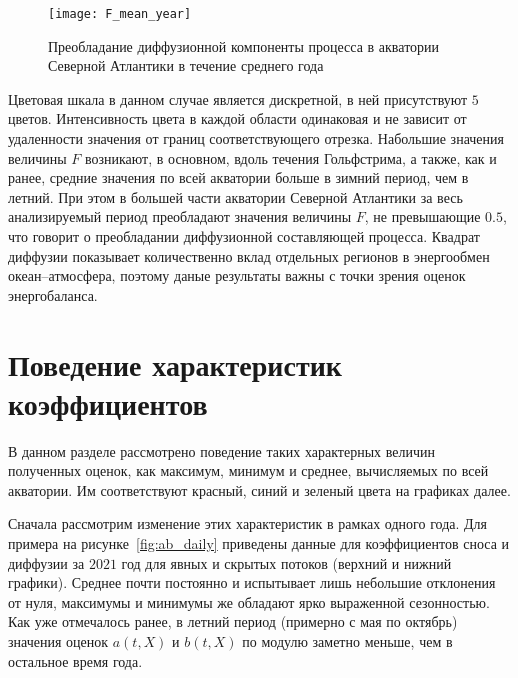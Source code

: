 
\begin{figure}[!h]
	\centering
	\texttt{[image: F\_mean\_year]}
	\caption{Преобладание диффузионной компоненты процесса в акватории Северной Атлантики в течение среднего года}
	\label{fig:f_mean_year}
\end{figure}

Цветовая шкала в данном случае является дискретной, в ней присутствуют $5$ цветов. Интенсивность цвета в каждой области одинаковая и не зависит от удаленности значения от границ соответствующего отрезка. Набольшие значения величины $F$ возникают, в основном, вдоль течения Гольфстрима, а также, как и ранее, средние значения по всей акватории больше в зимний период, чем в летний. При этом в большей части акватории Северной Атлантики за весь анализируемый период преобладают значения величины $F$, не превышающие $0.5$, что говорит о преобладании диффузионной составляющей процесса. Квадрат диффузии показывает количественно вклад отдельных регионов в энергообмен океан--атмосфера, поэтому даные результаты важны с точки зрения оценок энергобаланса.

\section{Поведение характеристик коэффициентов}

В данном разделе рассмотрено поведение таких характерных величин полученных оценок, как максимум, минимум и среднее, вычисляемых по всей акватории.
Им соответствуют красный, синий и зеленый цвета на графиках далее.

Сначала рассмотрим изменение этих характеристик в рамках одного года. Для примера на рисунке~\ref{fig:ab_daily} приведены данные для коэффициентов сноса и диффузии за $2021$ год для явных и скрытых потоков (верхний и нижний графики).
Среднее почти постоянно и испытывает лишь небольшие отклонения от нуля, максимумы и минимумы же обладают ярко выраженной сезонностью. Как уже отмечалось ранее, в летний период (примерно с мая по октябрь) значения оценок $a(t,X)$ и $b(t,X)$ по модулю заметно меньше, чем в остальное время года. 

